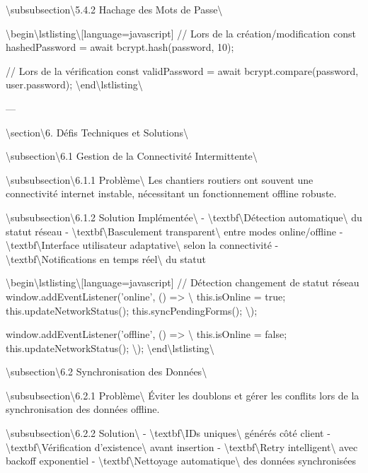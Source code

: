 \documentclass[12pt,a4paper]{report}
\begin{document}
\textbackslash{}subsubsection\textbackslash{}{5.4.2 Hachage des Mots de Passe\textbackslash{}}

\textbackslash{}begin\textbackslash{}{lstlisting\textbackslash{}}[language=javascript]
// Lors de la création/modification
const hashedPassword = await bcrypt.hash(password, 10);

// Lors de la vérification
const validPassword = await bcrypt.compare(password, user.password);
\textbackslash{}end\textbackslash{}{lstlisting\textbackslash{}}

---

\textbackslash{}section\textbackslash{}{6. Défis Techniques et Solutions\textbackslash{}}

\textbackslash{}subsection\textbackslash{}{6.1 Gestion de la Connectivité Intermittente\textbackslash{}}

\textbackslash{}subsubsection\textbackslash{}{6.1.1 Problème\textbackslash{}}
Les chantiers routiers ont souvent une connectivité internet instable, nécessitant un fonctionnement offline robuste.

\textbackslash{}subsubsection\textbackslash{}{6.1.2 Solution Implémentée\textbackslash{}}
- \textbackslash{}textbf\textbackslash{}{Détection automatique\textbackslash{}} du statut réseau
- \textbackslash{}textbf\textbackslash{}{Basculement transparent\textbackslash{}} entre modes online/offline
- \textbackslash{}textbf\textbackslash{}{Interface utilisateur adaptative\textbackslash{}} selon la connectivité
- \textbackslash{}textbf\textbackslash{}{Notifications en temps réel\textbackslash{}} du statut

\textbackslash{}begin\textbackslash{}{lstlisting\textbackslash{}}[language=javascript]
// Détection changement de statut réseau
window.addEventListener('online', () => \textbackslash{}{
    this.isOnline = true;
    this.updateNetworkStatus();
    this.syncPendingForms();
\textbackslash{}});

window.addEventListener('offline', () => \textbackslash{}{
    this.isOnline = false;
    this.updateNetworkStatus();
\textbackslash{}});
\textbackslash{}end\textbackslash{}{lstlisting\textbackslash{}}

\textbackslash{}subsection\textbackslash{}{6.2 Synchronisation des Données\textbackslash{}}

\textbackslash{}subsubsection\textbackslash{}{6.2.1 Problème\textbackslash{}}
Éviter les doublons et gérer les conflits lors de la synchronisation des données offline.

\textbackslash{}subsubsection\textbackslash{}{6.2.2 Solution\textbackslash{}}
- \textbackslash{}textbf\textbackslash{}{IDs uniques\textbackslash{}} générés côté client
- \textbackslash{}textbf\textbackslash{}{Vérification d'existence\textbackslash{}} avant insertion
- \textbackslash{}textbf\textbackslash{}{Retry intelligent\textbackslash{}} avec backoff exponentiel
- \textbackslash{}textbf\textbackslash{}{Nettoyage automatique\textbackslash{}} des données synchronisées
\end{document}
